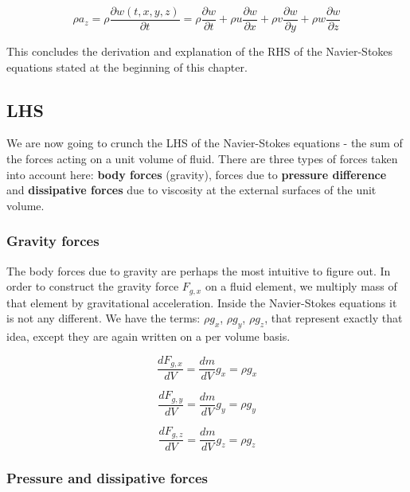 \begin{equation}
\rho a_z = \rho \frac{\partial w(t,x,y,z)}{\partial t} = \rho \frac{\partial w}{\partial t} + \rho u \frac{\partial w}{\partial x} + \rho v \frac{\partial w}{\partial y} + \rho w \frac{\partial w}{\partial z}
\end{equation}

This concludes the derivation and explanation of the RHS of the Navier-Stokes equations stated at the beginning of this chapter.


\subsection{LHS}

We are now going to crunch the LHS of the Navier-Stokes equations - the sum of the forces acting on a unit volume of fluid. There are three types of forces taken into account here: \textbf{body forces} (gravity), forces due to \textbf{pressure difference} and \textbf{dissipative forces} due to viscosity at the external surfaces of the unit volume.

\subsubsection{Gravity forces}

The body forces due to gravity are perhaps the most intuitive to figure out. In order to construct the gravity force $F_{g, x}$ on a fluid element, we multiply mass of that element by gravitational acceleration. Inside the Navier-Stokes equations it is not any different. We have the terms: $\rho g_x$, $\rho g_y$, $\rho g_z$, that represent exactly that idea, except they are again written on a per volume basis.

\begin{equation}
\frac{d F_{g, x}}{dV} = \frac{dm}{dV} g_x =  \rho g_x
\end{equation}

\begin{equation}
\frac{d F_{g, y}}{dV} = \frac{dm}{dV} g_y =  \rho g_y
\end{equation}

\begin{equation}
\frac{d F_{g, z}}{dV} = \frac{dm}{dV} g_z =  \rho g_z
\end{equation}

\subsubsection{Pressure and dissipative forces}



























